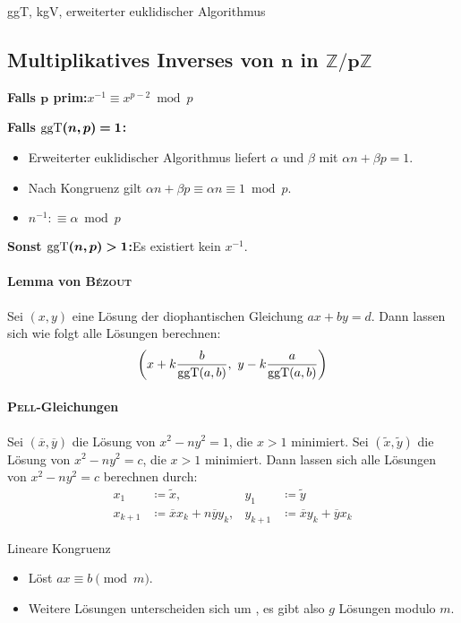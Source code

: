 \begin{algorithm}{ggT, kgV, erweiterter euklidischer Algorithmus}
\end{algorithm}

\subsection{Multiplikatives Inverses von $\boldsymbol{n}$ in $\boldsymbol{\mathbb{Z}/p\mathbb{Z}}$}
\textbf{Falls $\boldsymbol{p}$ prim:}\quad $x^{-1} \equiv x^{p-2} \bmod p$

\textbf{Falls $\boldsymbol{\text{ggT}(n, p) = 1}$:}
\begin{itemize}
	\item Erweiterter euklidischer Algorithmus liefert $\alpha$ und $\beta$ mit
	$\alpha n + \beta p = 1$.
	\item Nach Kongruenz gilt $\alpha n + \beta p \equiv \alpha n \equiv 1 \bmod p$.
	\item $n^{-1} :\equiv \alpha \bmod p$
\end{itemize}
\textbf{Sonst $\boldsymbol{\text{ggT}(n, p) > 1}$:}\quad Es existiert kein $x^{-1}$.

\paragraph{Lemma von \textsc{Bézout}}
Sei $(x, y)$ eine Lösung der diophantischen Gleichung $ax + by = d$.
Dann lassen sich wie folgt alle Lösungen berechnen:
\[
\left(x + k\frac{b}{\text{ggT}(a, b)},~y - k\frac{a}{\text{ggT}(a, b)}\right)
\]

\paragraph{\textsc{Pell}-Gleichungen}
Sei $(\overline{x}, \overline{y})$ die Lösung von $x^2 - ny^2 = 1$, die $x>1$ minimiert.
Sei $(\tilde{x}, \tilde{y})$ die Lösung von $x^2-ny^2 = c$, die $x>1$ minimiert. Dann lassen
sich alle Lösungen von $x^2-ny^2=c$ berechnen durch:
\begin{align*}
	x_1&\coloneqq \tilde{x}, & y_1&\coloneqq\tilde{y}\\
	x_{k+1}&\coloneqq \overline{x}x_k+n\overline{y}y_k, & y_{k+1}&\coloneqq\overline{x}y_k+\overline{y}x_k
\end{align*}

\begin{algorithm}{Lineare Kongruenz}
	\begin{itemize}
		\item Löst $ax\equiv b\pmod{m}$.
		\item Weitere Lösungen unterscheiden sich um , es gibt
		also $g$ Lösungen modulo $m$.
	\end{itemize}
\end{algorithm}


